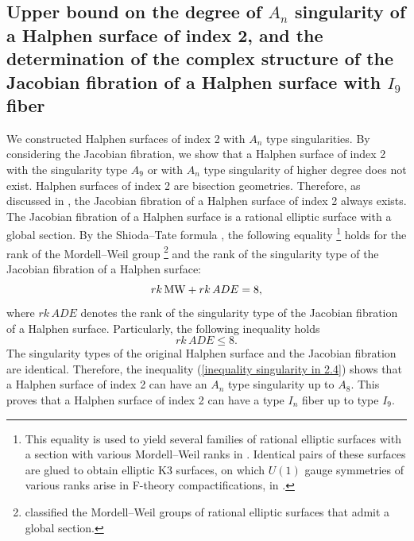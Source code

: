 \documentclass[12pt]{article}
\begin{document}
\subsection{Upper bound on the degree of $A_n$ singularity of a Halphen surface of index 2, and the determination of the complex structure of the Jacobian fibration of a Halphen surface with $I_9$ fiber}
\label{ssec 2.4}
We constructed Halphen surfaces of index 2 with $A_n$ type singularities. By considering the Jacobian fibration, we show that a Halphen surface of index 2 with the singularity type $A_9$ or with $A_n$ type singularity of higher degree does not exist. Halphen surfaces of index 2 are bisection geometries. Therefore, as discussed in \cite{BM}, the Jacobian fibration of a Halphen surface of index 2 always exists. The Jacobian fibration of a Halphen surface is a rational elliptic surface with a global section. By the Shioda--Tate formula \cite{Shiodamodular, Tate1, Tate2}, the following equality \footnote{This equality is used to yield several families of rational elliptic surfaces with a section with various Mordell--Weil ranks in \cite{Kimura1802}. Identical pairs of these surfaces are glued to obtain elliptic K3 surfaces, on which $U(1)$ gauge symmetries of various ranks arise in F-theory compactifications, in \cite{Kimura1802}.} holds for the rank of the Mordell--Weil group \footnote{\cite{OS} classified the Mordell--Weil groups of rational elliptic surfaces that admit a global section.} and the rank of the singularity type of the Jacobian fibration of a Halphen surface:
\begin{equation}
rk\, {\rm MW}+ rk\, ADE =8,
\end{equation}
where $rk\, ADE$ denotes the rank of the singularity type of the Jacobian fibration of a Halphen surface. Particularly, the following inequality holds  
\begin{equation}
\label{inequality singularity in 2.4}
rk\, ADE \le 8.
\end{equation}
The singularity types of the original Halphen surface and the Jacobian fibration are identical. Therefore, the inequality (\ref{inequality singularity in 2.4}) shows that a Halphen surface of index 2 can have an $A_n$ type singularity up to $A_8$. This proves that a Halphen surface of index 2 can have a type $I_n$ fiber up to type $I_9$. 
\end{document}
